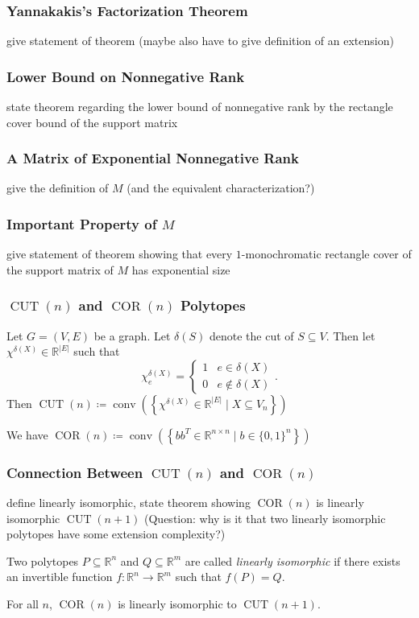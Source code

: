 \documentclass{beamer}
\newcommand{\abs}[1]{\left|#1\right|}
\newcommand{\conv}{\operatorname{conv}}
\newcommand{\CUT}{\operatorname{CUT}}
\newcommand{\COR}{\operatorname{COR}}
\renewcommand{\R}{\mathbb{R}}
\begin{document}
\begin{frame}
\frametitle{Yannakakis's Factorization Theorem}
give statement of theorem (maybe also have to give definition of an extension)
\end{frame}


\begin{frame}
\frametitle{Lower Bound on Nonnegative Rank}
state theorem regarding the lower bound of nonnegative rank by the rectangle cover bound of the support matrix
\end{frame}


\begin{frame}
\frametitle{A Matrix of Exponential Nonnegative Rank}
give the definition of $M$ (and the equivalent characterization?)
\end{frame}


\begin{frame}
\frametitle{Important Property of $M$}
give statement of theorem showing that every $1$-monochromatic rectangle cover of the support matrix of $M$ has exponential size
\end{frame}


\begin{frame}
\frametitle{$\CUT(n)$ and $\COR(n)$ Polytopes}
\begin{definition}
Let $G = (V,E)$ be a graph. Let $\delta(S)$ denote the cut of $S \subseteq V$. Then let $\chi^{\delta(X)} \in \R^{\abs{E}}$ such that
\[
\chi^{\delta(X)}_e =
\begin{cases}
1 & e \in \delta(X) \\
0 & e \notin \delta(X)
\end{cases}.
\]
Then $\CUT(n) \coloneqq \conv\left( \left\{ \chi^{\delta(X)} \in \R^{\abs{E}} \mid X \subseteq V_n \right\} \right)$
\end{definition}
\begin{definition}
We have $\COR(n) \coloneqq \conv\left( \left\{ bb^T \in \R^{n \times n} \mid b \in {\{0, 1\}}^n \right\} \right)$
\end{definition}
\end{frame}

\begin{frame}
\frametitle{Connection Between $\CUT(n)$ and $\COR(n)$}
define linearly isomorphic, state theorem showing $\COR(n)$ is linearly isomorphic $\CUT(n+1)$ (Question: why is it that two linearly isomorphic polytopes have some extension complexity?)

\begin{definition}\label{def:lin-iso}
Two polytopes $P \subseteq \R^n$ and $Q \subseteq \R^m$ are called \textit{linearly isomorphic} if there exists an invertible function $f : \R^n \to \R^m$ such that $f(P) = Q$.
\end{definition}
\begin{lemma}
For all $n$, $\COR(n)$ is linearly isomorphic to $\CUT(n+1)$.
\end{lemma}
\end{frame}
\end{document}
